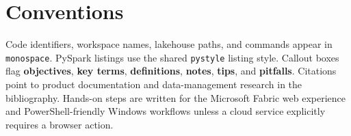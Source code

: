 \section*{Conventions}
Code identifiers, workspace names, lakehouse paths, and commands appear in \texttt{monospace}. PySpark listings use the shared \texttt{pystyle} listing style. Callout boxes flag \textbf{objectives}, \textbf{key terms}, \textbf{definitions}, \textbf{notes}, \textbf{tips}, and \textbf{pitfalls}. Citations point to product documentation and data-management research in the bibliography. Hands-on steps are written for the Microsoft Fabric web experience and PowerShell-friendly Windows workflows unless a cloud service explicitly requires a browser action.
